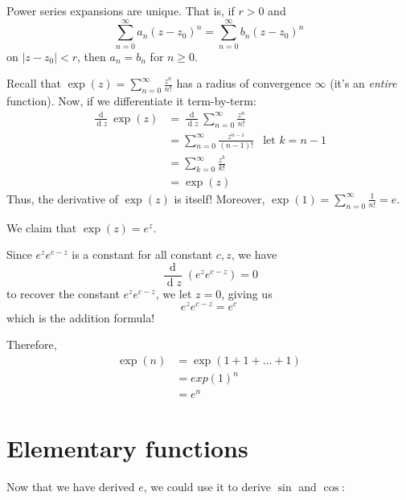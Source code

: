 \documentclass[12pt]{article}
\renewcommand{\d}{\ensuremath{\operatorname{d}}}
\begin{document}
\begin{corollary}
    Power series expansions are unique. That is, if $r>0$ and \[\sum_{n=0}^{\infty}a_n(z-z_0)^{n} = \sum_{n=0}^{\infty}b_n(z-z_0)^{n}\]
    on $|z-z_0|<r$, then $a_n=b_n$ for $n\geq 0$.
\end{corollary}

\rmk Recall that $\exp(z)=\sum_{n=0}^{\infty}\frac{z^n}{n!}$ has a radius of convergence $\infty$ (it's an \textit{entire} function). Now, if we differentiate it term-by-term:
\begin{align*}
    \frac{\d}{\d z}\exp(z)&=\frac{\d}{\d z}\sum_{n=0}^{\infty}\frac{z^n}{n!}\\
    &= \sum_{n=0}^{\infty}\frac{z^{n-1}}{(n-1)!} &\text{let }k=n-1\\
    &= \sum_{k=0}^{\infty} \frac{z^k}{k!}\\
    &= \exp(z)
\end{align*}
Thus, the derivative of $\exp(z)$ is itself! Moreover, $\exp(1)=\sum_{n=0}^{\infty}\frac{1}{n!}=e$.

\rmk We claim that $\exp(z)=e^z$.

Since $e^ze^{c-z}$ is a constant for all constant $c,z$, we have \[\frac{\d}{\d z}(e^ze^{c-z})=0\]
to recover the constant $e^ze^{c-z}$, we let $z=0$, giving us \[e^{z}e^{c-z}=e^{c}\]
which is the addition formula!

Therefore, \begin{align*}
    \exp(n) &= \exp(1+1+\dots+1)\\
    &= exp(1)^{n}\\
    &=e^n
\end{align*}

\section{Elementary functions}

Now that we have derived $e$, we could use it to derive $\sin$ and $\cos$:
\end{document}
